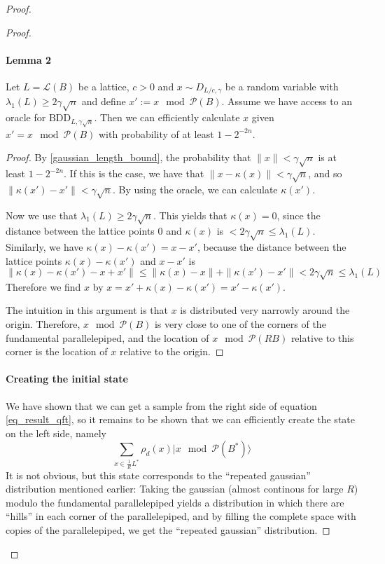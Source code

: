 \begin{proof}
\begin{proof}
\paragraph{Lemma 2}
Let $L = \mathcal{L}(B)$ be a lattice, $c > 0$ and $x \sim D_{L/c, \gamma}$ be a random variable with $\lambda_1(L) \geq 2\gamma\sqrt{n}$ and define $x' := x \mod \mathcal{P}(B)$. Assume we have access to an oracle for $\mathrm{BDD}_{L, \gamma\sqrt{n}}$. Then we can efficiently calculate $x$ given $x' = x \mod \mathcal{P}(B)$ with probability of at least $1 - 2^{-2n}$.

\begin{proof}
By \ref{gaussian_length_bound}, the probability that $\|x\| < \gamma\sqrt{n}$ is at least $1 - 2^{-2n}$. If this is the case, we have that $\| x - \kappa(x) \| < \gamma\sqrt{n}$, and so $\|\kappa(x') - x'\| < \gamma\sqrt{n}$. By using the oracle, we can calculate $\kappa(x')$.

Now we use that $\lambda_1(L) \geq 2\gamma\sqrt{n}$. This yields that $\kappa(x) = 0$, since the distance between the lattice points $0$ and $\kappa(x)$ is $< 2\gamma\sqrt{n} \leq \lambda_1(L)$. Similarly, we have $\kappa(x) - \kappa(x') = x - x'$, because the distance between the lattice points  $\kappa(x) - \kappa(x')$ and $x - x'$ is
\begin{equation}
\| \kappa(x) - \kappa(x') - x + x' \| \leq \| \kappa(x) - x \| + \| \kappa(x') - x' \| < 2\gamma\sqrt{n} \leq \lambda_1(L) \nonumber
\end{equation}
Therefore we find $x$ by $x = x' + \kappa(x) - \kappa(x') = x' - \kappa(x')$.

The intuition in this argument is that $x$ is distributed very narrowly around the origin. Therefore, $x \mod \mathcal{P}(B)$ is very close to one of the corners of the fundamental parallelepiped, and the location of $x \mod \mathcal{P}(RB)$ relative to this corner is the location of $x$ relative to the origin. \qedhere
\end{proof}

\paragraph{Creating the initial state} 
We have shown that we can get a sample from the right side of equation \ref{eq_result_qft}, so it remains to be shown that we can efficiently create the state on the left side, namely
\begin{equation}
\sum_{x \in \frac 1 R L^*} \rho_d(x) |x \mod \mathcal{P}(B^*)\rangle \nonumber
\end{equation}
It is not obvious, but this state corresponds to the ``repeated gaussian'' distribution mentioned earlier: Taking the gaussian (almost continous for large $R$) modulo the fundamental parallelepiped yields a distribution in which there are ``hills'' in each corner of the parallelepiped, and by filling the complete space with copies of the parallelepiped, we get the ``repeated gaussian'' distribution.


\end{proof}
\end{proof}
